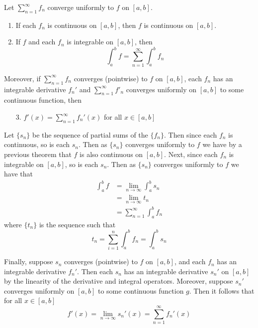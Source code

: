 \documentclass[12pt]{report}
\begin{document}
\begin{cor}{}{}
    Let $\sum\limits_{n=1}^{\infty}f_n$ converge uniformly to $f$ on $[a,b]$. \begin{enumerate}
        \item If each $f_n$ is continuous on $[a,b]$, then $f$ is continuous on $[a,b]$.
        \item If $f$ and each $f_n$ is integrable on $[a,b]$, then \begin{equation*}
                \int_a^bf = \sum\limits_{n=1}^{\infty}\int_a^bf_n
        \end{equation*}
    \end{enumerate}
    Moreover, if $\sum\limits_{n=1}^{\infty}f_n$ converges (pointwise) to $f$ on $[a,b]$, each $f_n$ has an integrable derivative $f_n'$ and $\sum\limits_{n=1}^{\infty}f'_n$ converges uniformly on $[a,b]$ to some continuous function, then \begin{enumerate}
        \item[3.] $f'(x) = \sum\limits_{n=1}^{\infty}f_n'(x)$   for all $x \in [a,b]$
    \end{enumerate}
\end{cor}
\begin{proof*}{}{}
    Let $\{s_n\}$ be the sequence of partial sums of the $\{f_n\}$. Then since each $f_n$ is continuous, so is each $s_n$. Then as $\{s_n\}$ converges uniformly to $f$ we have by a previous theorem that $f$ is also continuous on $[a,b]$. Next, since each $f_n$ is integrable on $[a,b]$, so is each $s_n$. Then as $\{s_n\}$ converges uniformly to $f$ we have that \begin{align*}
        \int_a^bf &= \lim\limits_{n\rightarrow \infty}\int_a^bs_n \\
        &= \lim\limits_{n\rightarrow\infty}t_n \\
        &= \sum\limits_{n=1}^{\infty}\int_a^bf_n
    \end{align*}
    where $\{t_n\}$ is the sequence such that \begin{equation*}
        t_n = \sum\limits_{i=1}^n\int_a^bf_n = \int_a^bs_n
    \end{equation*}

    Finally, suppose $s_n$ converges (pointwise) to $f$ on $[a,b]$, and each $f_n$ has an integrable derivative $f_n'$. Then each $s_n$ has an integrable derivative $s_n'$ on $[a,b]$ by the linearity of the derivative and integral operators. Moreover, suppose $s_n'$ converges uniformly on $[a,b]$ to some continuous function $g$. Then it follows that for all $x \in [a,b]$ \begin{equation*}
        f'(x) = \lim\limits_{n\rightarrow \infty}s_n'(x) = \sum\limits_{n=1}^{\infty}f_n'(x)
    \end{equation*}
\end{proof*}
\end{document}
